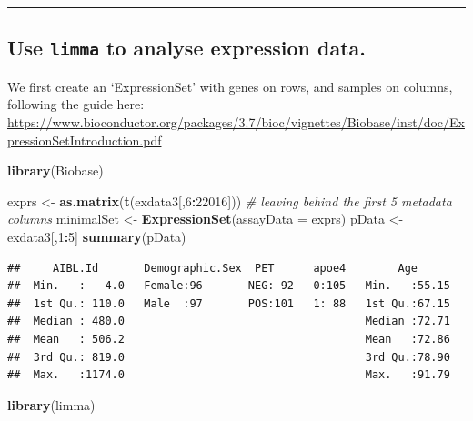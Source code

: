 \documentclass[]{article}
\newenvironment{Shaded}{\begin{snugshade}}{\end{snugshade}}
\newcommand{\KeywordTok}[1]{\textcolor[rgb]{0.13,0.29,0.53}{\textbf{#1}}}
\newcommand{\DataTypeTok}[1]{\textcolor[rgb]{0.13,0.29,0.53}{#1}}
\newcommand{\DecValTok}[1]{\textcolor[rgb]{0.00,0.00,0.81}{#1}}
\newcommand{\StringTok}[1]{\textcolor[rgb]{0.31,0.60,0.02}{#1}}
\newcommand{\CommentTok}[1]{\textcolor[rgb]{0.56,0.35,0.01}{\textit{#1}}}
\newcommand{\OperatorTok}[1]{\textcolor[rgb]{0.81,0.36,0.00}{\textbf{#1}}}
\newcommand{\NormalTok}[1]{#1}
\begin{document}
\begin{center}\rule{0.5\linewidth}{\linethickness}\end{center}

\subsection{\texorpdfstring{Use \texttt{limma} to analyse expression
data.}{Use limma to analyse expression data.}}\label{use-limma-to-analyse-expression-data.}

We first create an `ExpressionSet' with genes on rows, and samples on
columns, following the guide here:
\url{https://www.bioconductor.org/packages/3.7/bioc/vignettes/Biobase/inst/doc/ExpressionSetIntroduction.pdf}

\begin{Shaded}
\begin{Highlighting}[]
\KeywordTok{library}\NormalTok{(Biobase)}
\end{Highlighting}
\end{Shaded}

\begin{Shaded}
\begin{Highlighting}[]
\NormalTok{exprs <-}\StringTok{ }\KeywordTok{as.matrix}\NormalTok{(}\KeywordTok{t}\NormalTok{(exdata3[,}\DecValTok{6}\OperatorTok{:}\DecValTok{22016}\NormalTok{])) }\CommentTok{# leaving behind the first 5 metadata columns}
\NormalTok{minimalSet <-}\StringTok{ }\KeywordTok{ExpressionSet}\NormalTok{(}\DataTypeTok{assayData =}\NormalTok{ exprs)}
\NormalTok{pData <-}\StringTok{ }\NormalTok{exdata3[,}\DecValTok{1}\OperatorTok{:}\DecValTok{5}\NormalTok{]}
\KeywordTok{summary}\NormalTok{(pData)}
\end{Highlighting}
\end{Shaded}

\begin{verbatim}
##     AIBL.Id       Demographic.Sex  PET      apoe4        Age       
##  Min.   :   4.0   Female:96       NEG: 92   0:105   Min.   :55.15  
##  1st Qu.: 110.0   Male  :97       POS:101   1: 88   1st Qu.:67.15  
##  Median : 480.0                                     Median :72.71  
##  Mean   : 506.2                                     Mean   :72.86  
##  3rd Qu.: 819.0                                     3rd Qu.:78.90  
##  Max.   :1174.0                                     Max.   :91.79
\end{verbatim}

\begin{Shaded}
\begin{Highlighting}[]
\KeywordTok{library}\NormalTok{(limma)}
\end{Highlighting}
\end{Shaded}
\end{document}
